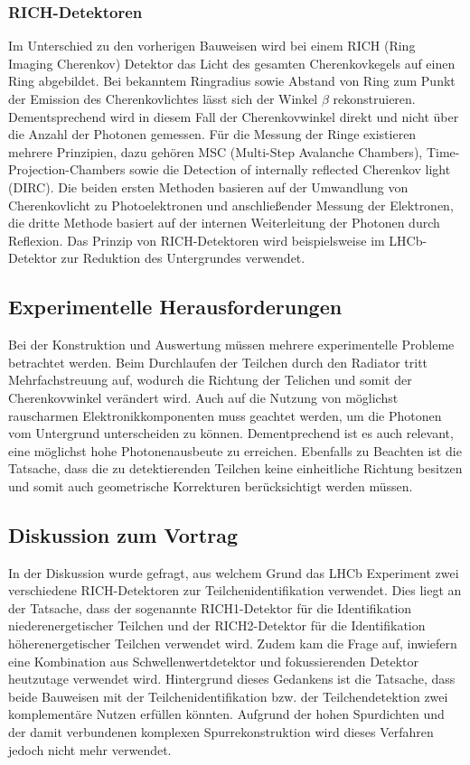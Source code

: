 \subsubsection{RICH-Detektoren}
Im Unterschied zu den vorherigen Bauweisen wird bei einem RICH (Ring Imaging Cherenkov) Detektor das Licht des gesamten Cherenkovkegels auf einen Ring abgebildet.
Bei bekanntem Ringradius sowie Abstand von Ring zum Punkt der Emission des Cherenkovlichtes lässt sich der Winkel $\beta$ rekonstruieren.
Dementsprechend wird in diesem Fall der Cherenkovwinkel direkt und nicht über die Anzahl der Photonen gemessen.
Für die Messung der Ringe existieren mehrere Prinzipien, dazu gehören MSC (Multi-Step Avalanche Chambers), Time-Projection-Chambers sowie die Detection of internally reflected Cherenkov light (DIRC).
Die beiden ersten Methoden basieren auf der Umwandlung von Cherenkovlicht zu Photoelektronen und anschließender Messung der Elektronen, die dritte Methode basiert auf der internen Weiterleitung der Photonen durch Reflexion.
Das Prinzip von RICH-Detektoren wird beispielsweise im LHCb-Detektor zur Reduktion des Untergrundes verwendet.

\subsection{Experimentelle Herausforderungen}
Bei der Konstruktion und Auswertung müssen mehrere experimentelle Probleme betrachtet werden.
Beim Durchlaufen der Teilchen durch den Radiator tritt Mehrfachstreuung auf, wodurch die Richtung der Telichen und somit der Cherenkovwinkel verändert wird.
Auch auf die Nutzung von möglichst rauscharmen Elektronikkomponenten muss geachtet werden, um die Photonen vom Untergrund unterscheiden zu können.
Dementprechend ist es auch relevant, eine möglichst hohe Photonenausbeute zu erreichen. 
Ebenfalls zu Beachten ist die Tatsache, dass die zu detektierenden Teilchen keine einheitliche Richtung besitzen und somit auch geometrische Korrekturen berücksichtigt werden müssen. 

\subsection{Diskussion zum Vortrag}
In der Diskussion wurde gefragt, aus welchem Grund das LHCb Experiment zwei verschiedene RICH-Detektoren zur Teilchenidentifikation verwendet.
Dies liegt an der Tatsache, dass der sogenannte RICH1-Detektor für die Identifikation niederenergetischer Teilchen und der RICH2-Detektor für die Identifikation höherenergetischer Teilchen verwendet wird.
Zudem kam die Frage auf, inwiefern eine Kombination aus Schwellenwertdetektor und fokussierenden Detektor heutzutage verwendet wird.
Hintergrund dieses Gedankens ist die Tatsache, dass beide Bauweisen mit der Teilchenidentifikation bzw. der Teilchendetektion zwei komplementäre Nutzen erfüllen könnten.
Aufgrund der hohen Spurdichten und der damit verbundenen komplexen Spurrekonstruktion wird dieses Verfahren jedoch nicht mehr verwendet.